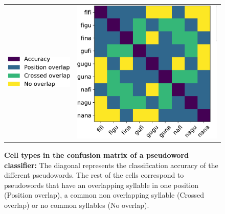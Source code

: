 \begin{figure}[ht]
\scriptsize
\hspace{-4ex}
\begin{tabular}{cl}
{\includegraphics[width=0.3\linewidth]{figures/part_II/super_matrix_legend.pdf}}
\hspace{-1ex}
&{\includegraphics[width=0.6\linewidth]{figures/part_II/super_matrix.pdf}}
\hspace{-1ex}\\
\end{tabular}
\caption{\textbf{Cell types in the confusion matrix of a pseudoword classifier:}
The diagonal represents the classification accuracy of the different pseudowords. The rest of the cells correspond to pseudowords that have an overlapping syllable in one position (Position overlap), a common non overlapping syllable (Crossed overlap) or no common syllables (No overlap).}
\label{fig:super_confusion}
\end{figure}


